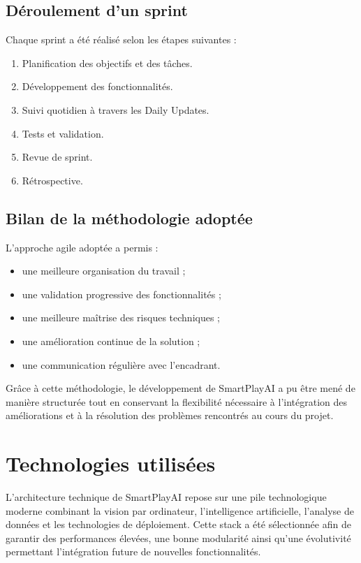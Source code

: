 \begin{itemize}
\subsection{Déroulement d’un sprint}
Chaque sprint a été réalisé selon les étapes suivantes :

\begin{enumerate}
    \item Planification des objectifs et des tâches.
    \item Développement des fonctionnalités.
    \item Suivi quotidien à travers les Daily Updates.
    \item Tests et validation.
    \item Revue de sprint.
    \item Rétrospective.
\end{enumerate}

\subsection{Bilan de la méthodologie adoptée}
L'approche agile adoptée a permis :

\begin{itemize}
    \item une meilleure organisation du travail ;
    \item une validation progressive des fonctionnalités ;
    \item une meilleure maîtrise des risques techniques ;
    \item une amélioration continue de la solution ;
    \item une communication régulière avec l'encadrant.
\end{itemize}

Grâce à cette méthodologie, le développement de SmartPlayAI a pu être mené de manière structurée tout en conservant la flexibilité nécessaire à l'intégration des améliorations et à la résolution des problèmes rencontrés au cours du projet.

\section{Technologies utilisées}

L’architecture technique de SmartPlayAI repose sur une pile technologique moderne combinant la vision par ordinateur, l’intelligence artificielle, l’analyse de données et les technologies de déploiement. Cette stack a été sélectionnée afin de garantir des performances élevées, une bonne modularité ainsi qu’une évolutivité permettant l’intégration future de nouvelles fonctionnalités.


\end{itemize}
